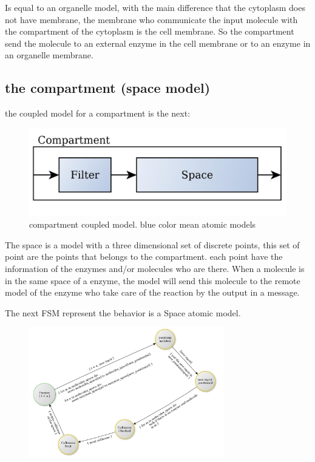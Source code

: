 \documentclass[12pt]{article}
\begin{document}
Is equal to an organelle model, with the main difference that the cytoplasm does not have membrane, the membrane who communicate the input molecule with the compartment of the cytoplasm is the cell membrane. So the compartment send the molecule to an external enzyme in the cell membrane or to an enzyme in an organelle membrane.

\subsection*{the compartment (space model)}

the coupled model for a compartment is the next:

\begin{figure}[h!]
 \centering
  \includegraphics[width=1\textwidth]{coupled-compartment.jpg}
 \caption{compartment coupled model. blue color mean atomic models}
\end{figure}

The space is a model with a three dimensional set of discrete points, this set of point are the points that belongs to the compartment. each point have the information of the enzymes and/or molecules who are there. When a molecule is in the same space of a enzyme, the model will send this molecule to the remote model of the enzyme who take care of the reaction by the output in a message. 

The next FSM represent the behavior is a Space atomic model.


\begin{figure}[h!]
 \centering
  \includegraphics[width=320px]{atomic-space.jpg}
\end{figure}
\end{document}
